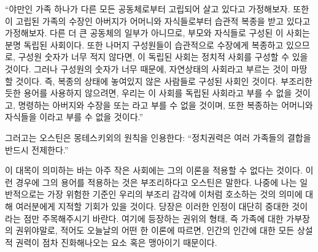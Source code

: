 ``야만인 가족 하나가 다른 모든 공동체로부터 고립되어 살고 있다고 가정해보자.
또한 이 고립된 가족의 수장인 아버지가 어머니와 자식들로부터
습관적 복종을 받고 있다고 가정해보자.
다른 더 큰 공동체의 일부가 아니므로,
부모와 자식들로 구성된 이 사회는 분명 독립된 사회이다.
또한 나머지 구성원들이 습관적으로 수장에게 복종하고 있으므로,
구성원 숫자가 너무 적지 않다면, 이 독립된 사회는 정치적 사회를
구성할 수 있을 것이다.
그러나 구성원의 숫자가 너무  때문에, 자연상태의 사회라고
부르는 것이 마땅할 것이다.
즉, 복종의 상태에 놓여있지 않은 사람들로 구성된 사회인 것이다.
부조리한 듯한 용어를 사용하지 않으려면,
우리는 이 사회를  독립된 사회라고 부를 수 없을 것이고,
명령하는 아버지와 수장을  또는 라고
부를 수 없을 것이며,
또한 복종하는 어머니와 자식들을 이라고 부를 수 없을 것이다.''

그러고는 오스틴은 몽테스키외의 원칙을 인용한다:
``정치권력은 여러 가족들의 결합을 반드시 전제한다.''

이 대목이 의미하는 바는 아주 작은 사회에는 그의 이론을 적용할 수
없다는 것이다.
이런 경우에 그의 용어를 적용하는 것은 부조리하다고 오스틴은 말한다.
나중에 나는 일반적으로는 가장 위험한 기준인 우리의 부조리 감각에
이처럼 호소하는 것의 의미에 대해
여러분에게 지적할 기회가 있을 것이다.
당장은 이러한 인정이 대단히 중대한 것이라는 점만 주목해주시기 바란다.
여기에 등장하는 권위의 형태, 즉
가족에 대한 가부장의 권위야말로,
적어도 오늘날의 어떤 한 이론에 따르면,
인간의 인간에 대한 모든 상설적 권력이 점차 진화해나오는
요소 혹은 맹아이기 때문이다.

